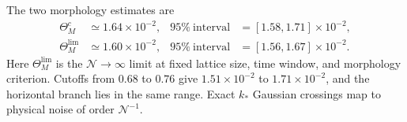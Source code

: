 \documentclass[aps,prl,twocolumn,superscriptaddress,nofootinbib,floatfix]{revtex4-2}
\newcommand{\cN}{\mathcal N}
\begin{document}
The two morphology estimates are
\begin{align}
 \Theta_M^c&\simeq1.64\times10^{-2},&
 95\%\ \text{interval}&=[1.58,1.71]\times10^{-2},\nonumber\\
 \Theta_M^{\mathrm{lim}}&\simeq1.60\times10^{-2},&
 95\%\ \text{interval}&=[1.56,1.67]\times10^{-2}.
 \label{eq:thetaMS}
\end{align}
Here $\Theta_M^{\mathrm{lim}}$ is the $\cN\to\infty$ limit at fixed lattice size, time window, and morphology criterion. Cutoffs from $0.68$ to $0.76$ give $1.51\times10^{-2}$ to $1.71\times10^{-2}$, and the horizontal branch lies in the same range. Exact $k_*$ Gaussian crossings map to physical noise of order $\cN^{-1}$.

\renewcommand{\bibfont}{\scriptsize}
\setlength{\bibsep}{-0.5pt plus 0.2pt}

%
\end{document}
